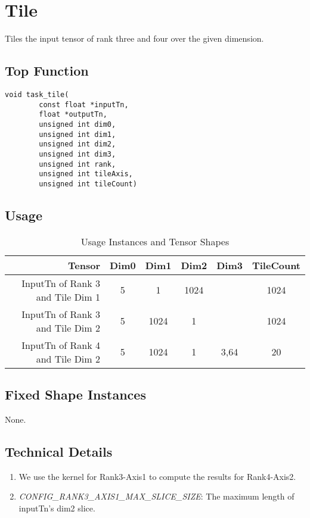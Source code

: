 \section{Tile}
Tiles the input tensor of rank three and four over the given dimension.

\subsection{Top Function}
\begin{lstlisting}
void task_tile(
		const float *inputTn,
		float *outputTn,
		unsigned int dim0,
		unsigned int dim1,
		unsigned int dim2,
		unsigned int dim3,
		unsigned int rank,
		unsigned int tileAxis,
		unsigned int tileCount)
\end{lstlisting}

\subsection{Usage}
\begin{table}[htbp] %
\caption{Usage Instances and Tensor Shapes}
	\begin{center}
		\begin{tabular}{|r|c|c|c|c|c|} 
		\hline	
		Tensor & Dim0 & Dim1 & Dim2 & Dim3 & TileCount\\ 
		\hline	
		InputTn of Rank 3 and Tile Dim 1&
			5 &
			1 &
			1024 &
			  &
			1024\\ 
		\hline	
		InputTn of Rank 3 and Tile Dim 2&
			5 &
			1024 &
			1 &
			  &
			1024\\ 
		\hline 
		InputTn of Rank 4 and Tile Dim 2&
			5 &
			1024 &
			1 &
			3,64&
			20 \\ 
		\hline
		\end{tabular}
	\end{center}
\end{table}


\subsection{Fixed Shape Instances}
None.

\subsection{Technical Details}
\begin{enumerate}
\item We use the kernel for Rank3-Axis1 to compute the results for Rank4-Axis2.

\item \emph{CONFIG\_RANK3\_AXIS1\_MAX\_SLICE\_SIZE}: The maximum length of inputTn's dim2 slice.
\end{enumerate}












